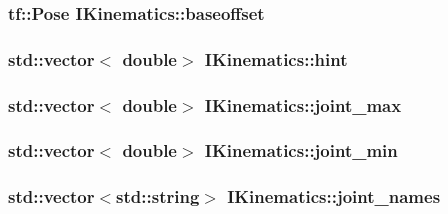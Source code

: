 \hypertarget{classIKinematics_aa599f7938cbf1c9b422a6d4d50e8e1a9}{
\subsubsection[{baseoffset}]{\setlength{\rightskip}{0pt plus 5cm}tf\-::\-Pose I\-Kinematics\-::baseoffset\hspace{0.3cm}{\ttfamily [protected]}}}\label{classIKinematics_aa599f7938cbf1c9b422a6d4d50e8e1a9}
\hypertarget{classIKinematics_a7e8f1a113eafba9c64ab73a8cb279924}{
\subsubsection[{hint}]{\setlength{\rightskip}{0pt plus 5cm}std\-::vector$<$ double$>$ I\-Kinematics\-::hint\hspace{0.3cm}{\ttfamily [protected]}}}\label{classIKinematics_a7e8f1a113eafba9c64ab73a8cb279924}
\hypertarget{classIKinematics_a4422f638d9b33ef9ccc9837ac8c1d76d}{
\subsubsection[{joint\-\_\-max}]{\setlength{\rightskip}{0pt plus 5cm}std\-::vector$<$ double$>$ I\-Kinematics\-::joint\-\_\-max\hspace{0.3cm}{\ttfamily [protected]}}}\label{classIKinematics_a4422f638d9b33ef9ccc9837ac8c1d76d}
\hypertarget{classIKinematics_ab061c2931468c4717f7cff67b697d364}{
\subsubsection[{joint\-\_\-min}]{\setlength{\rightskip}{0pt plus 5cm}std\-::vector$<$ double$>$ I\-Kinematics\-::joint\-\_\-min\hspace{0.3cm}{\ttfamily [protected]}}}\label{classIKinematics_ab061c2931468c4717f7cff67b697d364}
\hypertarget{classIKinematics_abe955106c03418e9280763a85275ce0f}{
\subsubsection[{joint\-\_\-names}]{\setlength{\rightskip}{0pt plus 5cm}std\-::vector$<$std\-::string$>$ I\-Kinematics\-::joint\-\_\-names\hspace{0.3cm}{\ttfamily [protected]}}}\label{classIKinematics_abe955106c03418e9280763a85275ce0f}
